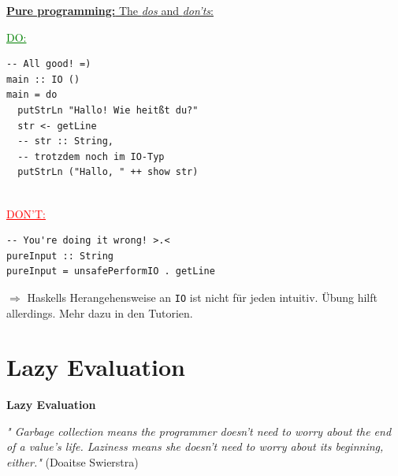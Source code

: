 \documentclass[unknownkeysallowed]{beamer}
\begin{document}
\begin{frame}[fragile]

\underline{\textbf{Pure programming:} The \emph{dos} and \emph{don'ts}:} \pause

\begin{multicols}{2}

\textcolor{green}{\underline{DO:}} \bigskip

\begin{verbatim}
-- All good! =)
main :: IO ()
main = do
  putStrLn "Hallo! Wie heitßt du?"
  str <- getLine
  -- str :: String, 
  -- trotzdem noch im IO-Typ
  putStrLn ("Hallo, " ++ show str) 
  
\end{verbatim}

\columnbreak
\pause

\textcolor{red}{\underline{DON'T:}} \bigskip

\begin{verbatim}
-- You're doing it wrong! >.<
pureInput :: String
pureInput = unsafePerformIO . getLine
\end{verbatim}

\vfill

\end{multicols}

\pause
$\Rightarrow$ Haskells Herangehensweise an \texttt{IO} ist nicht für jeden intuitiv.
 Übung hilft allerdings. Mehr dazu in den Tutorien.

\end{frame}


  
\section{Lazy Evaluation}
\begin{frame}

    \begin{center}
    \Large\textbf{Lazy Evaluation} \scriptsize \bigskip
    
    \textit{" Garbage collection means the programmer doesn't need to worry about the end of 
    a value's life. Laziness means she doesn't need to worry about its beginning, 
    either."}
    (Doaitse Swierstra)
    
    \end{center}

\end{frame}
\end{document}
